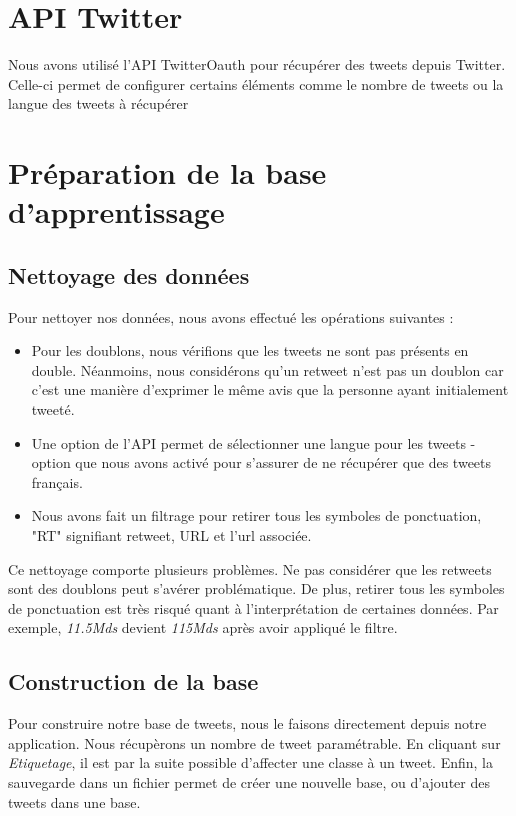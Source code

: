 \documentclass[a4paper,10pt]{report}
\begin{document}
  \section{API Twitter}
    Nous avons utilisé l'API TwitterOauth pour récupérer des tweets depuis Twitter. Celle-ci permet de configurer certains éléments comme le nombre de tweets
    ou la langue des tweets à récupérer
  \section{Préparation de la base d'apprentissage}
    \subsection{Nettoyage des données}
      Pour nettoyer nos données, nous avons effectué les opérations suivantes : 
      \begin{itemize}
       \item Pour les doublons, nous vérifions que les tweets ne sont pas présents en double. Néanmoins, nous considérons qu'un retweet n'est pas un doublon car c'est une manière d'exprimer le même avis que la personne ayant initialement tweeté.
       \item Une option de l'API permet de sélectionner une langue pour les tweets - option que nous avons activé pour s'assurer de ne récupérer que des tweets français.
       \item Nous avons fait un filtrage pour retirer tous les symboles de ponctuation, "RT" signifiant retweet, URL et l'url associée.
      \end{itemize}
      Ce nettoyage comporte plusieurs problèmes. Ne pas considérer que les retweets sont des doublons peut s'avérer problématique.
      De plus, retirer tous les symboles de ponctuation est très risqué quant à l'interprétation de certaines données.
      Par exemple, \textit{11.5Mds} devient \textit{115Mds} après avoir appliqué le filtre.
      

    \subsection{Construction de la base}
      Pour construire notre base de tweets, nous le faisons directement depuis notre application. Nous récupèrons un nombre de tweet paramétrable.
      En cliquant sur \emph{Etiquetage}, il est par la suite possible d'affecter une classe à un tweet.
      Enfin, la sauvegarde dans un fichier permet de créer une nouvelle base, ou d'ajouter des tweets dans une base.
\end{document}
